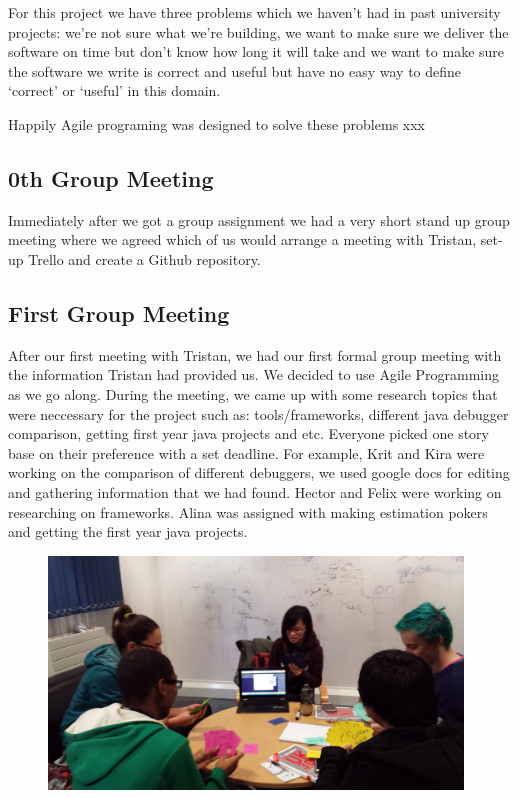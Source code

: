\documentclass[11pt]{article}
\begin{document}
For this project we have three problems which we haven't had in past university projects: we're not sure what we're building, we want to make sure we deliver the software on time but don't know how long it will take and
we want to make sure the software we write is correct and useful but have no easy way to define `correct' or `useful' in this domain.

Happily Agile programing was designed to solve these problems xxx

\subsection{0th Group Meeting}
Immediately after we got a group assignment we had a very short stand up group meeting where we agreed which of us would arrange a meeting with Tristan, set-up Trello and create a Github repository.  

\subsection{First Group Meeting}
After our first meeting with Tristan, we had our first formal group meeting with the information Tristan had provided us. We decided to use Agile Programming as we go along. During the meeting, we came up with some research topics that were neccessary for the project such as: tools/frameworks, different java debugger comparison, getting first year java projects and etc. Everyone picked one story base on their preference with a set deadline. For example, Krit and Kira were working on the comparison of different debuggers, we used google docs for editing and gathering information that we had found. Hector and Felix were working on researching on frameworks. Alina was assigned with making estimation pokers and getting the first year java projects. 
\begin{figure}[h!]
\centering
\includegraphics[width=110mm]{estimation.jpg}
\end{figure}  
\end{document}
